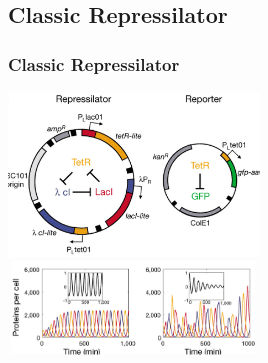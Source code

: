 \documentclass{beamer}
\begin{document}
\subsection{Classic Repressilator}
\begin{frame}
\frametitle{Classic Repressilator}
\includegraphics[width=0.5\textwidth]{repressilator_plasmids.png}
\hfill
\includegraphics[width=0.5\textwidth]{repressilator_time.png}
\end{frame}
\end{document}
